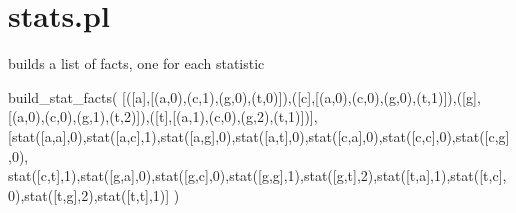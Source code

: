 


\section{stats.pl}

\label{sec:stats}

\begin{description}
builds a list of facts, one for each statistic

\begin{code}
build_stat_facts(
      [([a],[(a,0),(c,1),(g,0),(t,0)]),([c],[(a,0),(c,0),(g,0),(t,1)]),([g],[(a,0),(c,0),(g,1),(t,2)]),([t],[(a,1),(c,0),(g,2),(t,1)])],
      [stat([a,a],0),stat([a,c],1),stat([a,g],0),stat([a,t],0),stat([c,a],0),stat([c,c],0),stat([c,g],0),
       stat([c,t],1),stat([g,a],0),stat([g,c],0),stat([g,g],1),stat([g,t],2),stat([t,a],1),stat([t,c],0),stat([t,g],2),stat([t,t],1)]
      )
\end{code}

\end{description}

